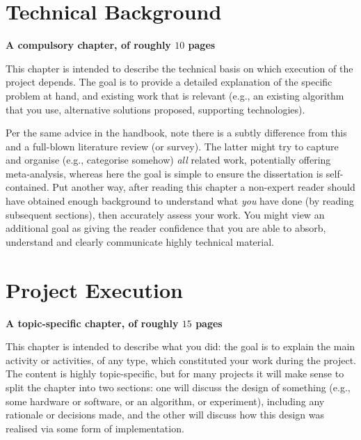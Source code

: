\documentclass[ %
                    author={Tom Jager},
                supervisor={Dr. Daniel Schien},
                    degree={MEng},
                     title={A Bayesian Inference Engine for UMIS Structured Data},
                  subtitle={},
                      type={research},
                      year={2019} ]{dissertation}
\begin{document}

\chapter{Technical Background}
\label{chap:technical}

{\bf A compulsory chapter,     of roughly $10$ pages} 
\vspace{1cm} 

\noindent

This chapter is intended to describe the technical basis on which execution
of the project depends.  The goal is to provide a detailed explanation of
the specific problem at hand, and existing work that is relevant (e.g., an
existing algorithm that you use, alternative solutions proposed, supporting
technologies).  

Per the same advice in the handbook, note there is a subtly difference from
this and a full-blown literature review (or survey).  The latter might try
to capture and organise (e.g., categorise somehow) {\em all} related work,
potentially offering meta-analysis, whereas here the goal is simple to
ensure the dissertation is self-contained.  Put another way, after reading 
this chapter a non-expert reader should have obtained enough background to 
understand what {\em you} have done (by reading subsequent sections), then 
accurately assess your work.  You might view an additional goal as giving 
the reader confidence that you are able to absorb, understand and clearly 
communicate highly technical material.


\chapter{Project Execution}
\label{chap:execution}

{\bf A topic-specific chapter, of roughly $15$ pages} 
\vspace{1cm} 

\noindent
This chapter is intended to describe what you did: the goal is to explain
the main activity or activities, of any type, which constituted your work 
during the project.  The content is highly topic-specific, but for many 
projects it will make sense to split the chapter into two sections: one 
will discuss the design of something (e.g., some hardware or software, or 
an algorithm, or experiment), including any rationale or decisions made, 
and the other will discuss how this design was realised via some form of 
implementation.  
\end{document}
